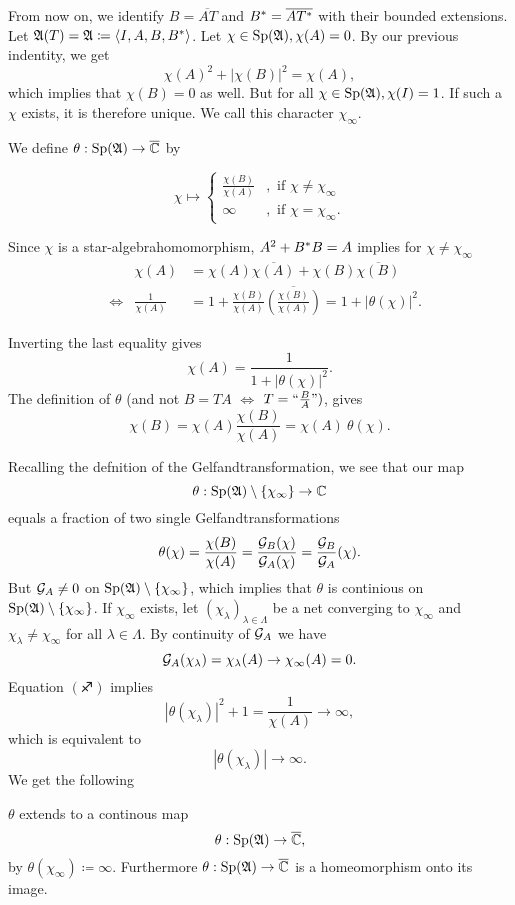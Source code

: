 From now on, we identify $B=\overline{AT}$ and $B^{*} =\overline{AT^{*}}$  with their bounded extensions.
Let $\mathfrak{A} (T) = \mathfrak{A} \coloneqq \left\langle I, A, B , B^{*} \right\rangle$. Let $ \chi \in \operatorname{Sp} (\mathfrak{A}), \chi(A) =0$. By our previous indentity, we get
\[
 \chi(A)^2 + |\chi(B)|^2 = \chi(A),
\]
which implies that $\chi(B) =0$ as well. But for all $\chi \in \operatorname{Sp} (\mathfrak{A}), \chi(I)=1$. If such a $\chi$ exists, it is therefore unique. We call this character $\chi_\infty$.

We define $\theta : \operatorname{Sp} (\mathfrak{A}) \to \overline{\mathbb{C}}$ by

 \[
 \chi \mapsto 
  \begin{cases}
    \frac{\chi(B)}{\chi(A)} &, \text{ if }\chi \neq \chi_\infty\\
    \infty &, \text{ if } \chi = \chi_\infty.
    \end{cases}
 \]
 
 Since $\chi$ is a star-algebrahomomorphism, $A^2 + B^{*} B = A$ implies for $\chi \neq \chi_\infty$
 \begin{align*}
  &  & \chi(A) &= \chi(A) \overline{\chi(A)} + \chi(B) \overline{\chi(B)} \\
  &\Leftrightarrow& \frac{1}{\chi(A)} &= 1 + \frac{\chi(B)}{\chi(A)} \overline{\left( \frac{\chi(B)}{\chi(A)} \right)} = 1 + | \theta(\chi)|^2. 
 \end{align*}
 

Inverting the last equality gives
\[
 \chi(A) = \frac{1}{1 + |\theta (\chi)|^2} \tag{\blankone}.
\]
The definition of $\theta$ (and not $B= TA$ $\Leftrightarrow$ $T = `` \frac{B}{A} ")$, gives
\[
 \chi(B) = \chi(A) \frac{\chi(B)}{\chi(A)}= \chi(A)~ \theta(\chi) \tag{\blanktwo}.
\]

Recalling the defnition of the Gelfandtransformation, we see that our map
\[
 \theta : \operatorname{Sp}(\mathfrak{A}) \setminus \left\lbrace\chi_\infty\right\rbrace \to \mathbb{C}
\]
equals a fraction of two single Gelfandtransformations
\[
 \theta(\chi) = \frac{\chi(B)}{\chi(A)} = \frac{\mathcal{G}_B (\chi)}{\mathcal{G}_A (\chi)}= \frac{\mathcal{G}_B}{\mathcal{G}_A}(\chi).
\]
But $\mathcal{G}_A \neq 0$ on $\operatorname{Sp}(\mathfrak{A}) \setminus \left\lbrace\chi_\infty\right\rbrace$, which implies that $\theta$ is continious on $\operatorname{Sp}(\mathfrak{A}) \setminus \left\lbrace\chi_\infty\right\rbrace$.
If $\chi_\infty$ exists, let $ \left( \chi_\lambda \right) _{\lambda \in \Lambda}$ be a net converging to $\chi_\infty$ and $\chi_\lambda \neq \chi_\infty$ for all $\lambda \in \Lambda$. By continuity of $\mathcal{G}_A$ we have
\[
 \mathcal{G}_A (\chi_\lambda) = \chi_\lambda (A) \to \chi_\infty (A) = 0.
\]
Equation $(\sagittarius)$ implies
\[
 | \theta( \chi_\lambda ) | ^2  + 1 = \frac{1}{\chi(A)} \to \infty,
\]
which is equivalent to 
\[
 | \theta (\chi_\lambda ) | \to \infty.
\]
We get the following 
\begin{lem}
$\theta$ extends to a continous map
\[
 \theta : \operatorname{Sp}(\mathfrak{A}) \to \overline{\mathbb{C}},
\]
by $\theta (\chi_\infty) \coloneqq \infty$.
Furthermore $\theta : \operatorname{Sp} (\mathfrak{A}) \to \overline{\mathbb{C}}$ is a homeomorphism onto its image.
\end{lem}

